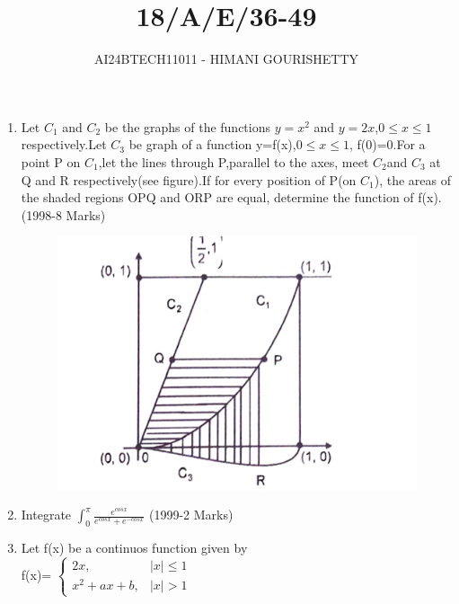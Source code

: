 \documentclass[journal,12pt,twocolumn]{IEEEtran}
\theoremstyle{remark}
\begin{document}

\vspace{3cm}

\title{18/A/E/36-49}
\author{AI24BTECH11011 - HIMANI GOURISHETTY}
\maketitle
\newpage
\bigskip

\renewcommand{\thefigure}{\theenumi}
\renewcommand{\thetable}{\theenumi}

\begin{enumerate}
\item Let $C_1$ and $C_2$ be the graphs of the functions $y=x^2$ and $y=2x$,$0\le x\le1$ respectively.Let $C_3$ be graph of a function y=f(x),$0\le x \le 1$, f(0)=0.For a point P on $C_1$,let the lines through P,parallel to the axes, meet $C_2$and $C_3$ at Q and R respectively(see figure).If for every position of P(on $C_1$), the areas of the shaded regions OPQ and ORP are equal, determine the function of f(x).
\hfill{(1998-8 Marks)}
\begin{figure}[h!]
\centering
\includegraphics[width=1\linewidth]{figs/fig1.png}
\label{fig:11011}
\end{figure}		        
\item Integrate $\int_{0}^{\pi}\frac{e^{cosx}}{e^{cosx}+e^{-cosx}}$
\hfill{(1999-2 Marks)}\\	      			
\item Let f(x) be a continuos function given by \\
f(x)=
$\begin{cases}
2x,& |x|\le1\\
x^2+ax+b,&|x|>1
\end{cases}$

\end{enumerate}
\end{document}
